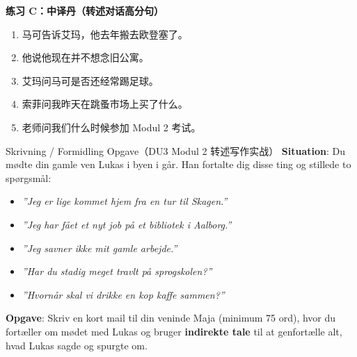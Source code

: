 \textbf{练习 C：中译丹（转述对话高分句）}
\begin{enumerate}
  \item 马可告诉艾玛，他去年搬去欧登塞了。
  \item 他说他现在并不想念旧公寓。
  \item 艾玛问马可是否还经常踢足球。
  \item 索菲问我昨天在跳蚤市场上买了什么。
  \item 老师问我们什么时候参加 Modul 2 考试。
\end{enumerate}


\begin{emailbox}{Skrivning / Formidling Opgave（DU3 Modul 2 转述写作实战）}
\textbf{Situation}: Du mødte din gamle ven Lukas i byen i går. Han fortalte dig disse ting og stillede to spørgsmål:
\begin{itemize}
  \item \textit{”Jeg er lige kommet hjem fra en tur til Skagen.”}
  \item \textit{”Jeg har fået et nyt job på et bibliotek i Aalborg.”}
  \item \textit{”Jeg savner ikke mit gamle arbejde.”}
  \item \textit{”Har du stadig meget travlt på sprogskolen?”}
  \item \textit{”Hvornår skal vi drikke en kop kaffe sammen?”}
\end{itemize}
\textbf{Opgave}: Skriv en kort mail til din veninde Maja (minimum 75 ord), hvor du fortæller om mødet med Lukas og bruger \textbf{indirekte tale} til at genfortælle alt, hvad Lukas sagde og spurgte om.
\end{emailbox}

